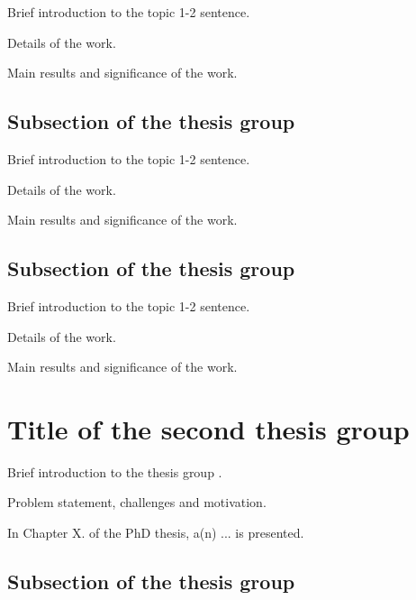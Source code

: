 \documentclass{article}
\begin{document}
Brief introduction to the topic 1-2 sentence.

Details of the work.

Main results and significance of the work.

\subsection{Subsection of the thesis group}


Brief introduction to the topic 1-2 sentence.

Details of the work.

Main results and significance of the work.

\subsection{Subsection of the thesis group}


Brief introduction to the topic 1-2 sentence.

Details of the work.

Main results and significance of the work.

\section{Title of the second thesis group}

Brief introduction to the thesis group \cite{b:mays01}.

Problem statement, challenges and motivation.

In Chapter X. of the PhD thesis, a(n) ... is presented.

\subsection{Subsection of the thesis group}

\end{document}

